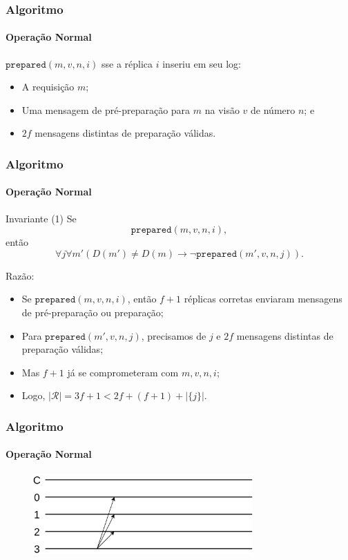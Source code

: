 \documentclass{beamer}
\begin{document}
\begin{frame}
  \frametitle{Algoritmo}
  \framesubtitle{Operação Normal}

  $\texttt{prepared}(m, v, n, i)$ sse a réplica $i$ inseriu em seu log:
  \begin{itemize}
    \item
      A requisição $m$;

    \item
      Uma mensagem de pré-preparação para $m$ na visão $v$ de número $n$; e

    \item
      $2f$ mensagens distintas de preparação válidas.
  \end{itemize}
\end{frame}

\begin{frame}
  \frametitle{Algoritmo}
  \framesubtitle{Operação Normal}

  \begin{block}{Invariante (1)}
    Se $$\texttt{prepared}(m, v, n, i),$$ então $$\forall j \forall m' (D(m') \neq D(m) \to \lnot \texttt{prepared}(m', v, n, j)).$$
  \end{block}

  Razão:
  \begin{itemize}
    \item
      Se $\texttt{prepared}(m, v, n, i)$, então $f + 1$ réplicas corretas enviaram mensagens de pré-preparação ou preparação;

    \item
      Para $\texttt{prepared}(m', v, n, j)$, precisamos de $j$ e $2f$ mensagens distintas de preparação válidas;

    \item
      Mas $f + 1$ já se comprometeram com $m, v, n, i$;
      
    \item
      Logo, $|\mathcal{R}| = 3f + 1 < 2f + (f + 1) + |\{j\}|$.
  \end{itemize}
\end{frame}

\begin{frame}
  \frametitle{Algoritmo}
  \framesubtitle{Operação Normal}

  \begin{figure}
    \includegraphics[width=0.75\textwidth]{images/prepare}
  \end{figure}
\end{frame}
\end{document}
